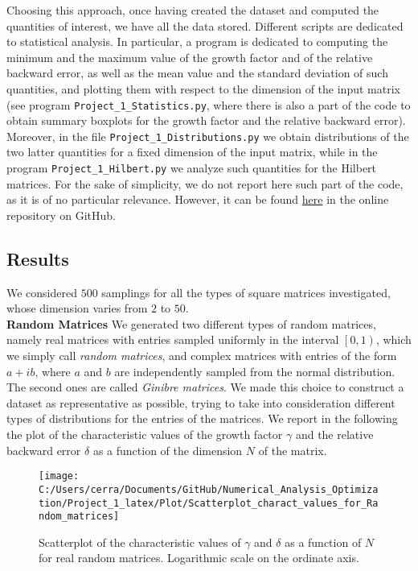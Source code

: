 \documentclass[a4paper,11pt]{article}
\begin{document}
\noindent Choosing this approach, once having created the dataset and computed the quantities of interest, we have all the data stored. Different scripts are dedicated to statistical analysis. In particular, a program is dedicated to computing the minimum and the maximum value of the growth factor and of the relative backward error, as well as the mean value and the standard deviation of such quantities, and plotting them with respect to the dimension of the input matrix (see program \texttt{Project_1_Statistics.py}, where there is also a part of the code to obtain summary boxplots for the growth factor and the relative backward error). Moreover, in the file \texttt{Project_1_Distributions.py} we obtain distributions of the two latter quantities for a fixed dimension of the input matrix, while in the program \texttt{Project_1_Hilbert.py} we analyze such quantities for the Hilbert matrices. For the sake of simplicity, we do not report here such part of the code, as it is of no particular relevance. However, it can be found \href{https://github.com/nunziacerrato/Numerical_Analysis_Optimization/blob/main/Project_1/Statistics_Project_1.py}{here} in the online repository on GitHub.

\subsection{Results}
We considered $500$ samplings for all the types of square matrices investigated, whose dimension varies from $2$ to $50$.\\

\noindent \textbf{Random Matrices } We generated two different types of random matrices, namely real matrices with entries sampled uniformly in the interval $\left[0,1\right)$, which we simply call \textit{random matrices}, and complex matrices with entries of the form $a+ib$, where $a$ and $b$ are independently sampled from the normal distribution. The second ones are called \textit{Ginibre matrices}. We made this choice to construct a dataset as representative as possible, trying to take into consideration different types of distributions for the entries of the matrices. We report in the following the plot of the characteristic values of the growth factor $\gamma$ and the relative backward error $\delta$ as a function of the dimension $N$ of the matrix.

\begin{figure}[H]
	\centering
	\texttt{[image: C:/Users/cerra/Documents/GitHub/Numerical\_Analysis\_Optimization/Project\_1\_latex/Plot/Scatterplot\_charact\_values\_for\_Random\_matrices]}
	\caption{Scatterplot of the characteristic values of $\gamma$ and $\delta$ as a function of $N$ for real random matrices. Logarithmic scale on the ordinate axis.}
	\label{fig:Scatterplot_Random}
\end{figure}
\end{document}
